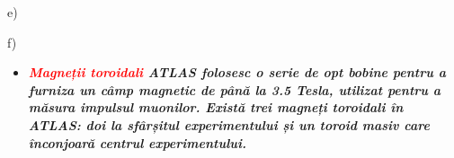 \documentclass{beamer}
\begin{document}
\begin{frame}{e) }
\end{frame}

\begin{frame}{f) }

\vspace{-2.5cm}

\begin{itemize}

\small

\item [\ding{74}]\makebox[0.5cm]{} \textit{\textbf{\textcolor{red}{Magneții toroidali} ATLAS folosesc o serie de opt bobine pentru a furniza un câmp magnetic de până la 3.5 Tesla, utilizat pentru a măsura impulsul muonilor. Există trei magneți toroidali în ATLAS: doi la sfârșitul experimentului și un toroid masiv care înconjoară centrul experimentului.}}

\end{itemize}



\end{frame}
\end{document}
